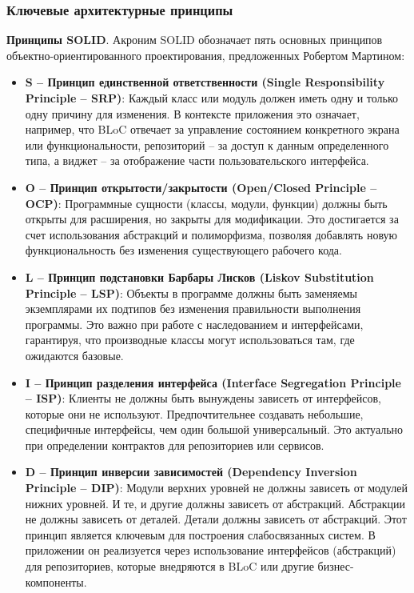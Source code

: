 \subsubsection*{Ключевые архитектурные принципы}
\textbf{Принципы SOLID}.
Акроним SOLID обозначает пять основных принципов объектно-ориентированного проектирования, предложенных Робертом Мартином:
\begin{itemize}
    \item \textbf{S – Принцип единственной ответственности (Single Responsibility Principle – SRP)}: Каждый класс или модуль должен иметь одну и только одну причину для изменения. В контексте приложения это означает, например, что BLoC отвечает за управление состоянием конкретного экрана или функциональности, репозиторий – за доступ к данным определенного типа, а виджет – за отображение части пользовательского интерфейса.
    \item \textbf{O – Принцип открытости/закрытости (Open/Closed Principle – OCP)}: Программные сущности (классы, модули, функции) должны быть открыты для расширения, но закрыты для модификации. Это достигается за счет использования абстракций и полиморфизма, позволяя добавлять новую функциональность без изменения существующего рабочего кода.
    \item \textbf{L – Принцип подстановки Барбары Лисков (Liskov Substitution Principle – LSP)}: Объекты в программе должны быть заменяемы экземплярами их подтипов без изменения правильности выполнения программы. Это важно при работе с наследованием и интерфейсами, гарантируя, что производные классы могут использоваться там, где ожидаются базовые.
    \item \textbf{I – Принцип разделения интерфейса (Interface Segregation Principle – ISP)}: Клиенты не должны быть вынуждены зависеть от интерфейсов, которые они не используют. Предпочтительнее создавать небольшие, специфичные интерфейсы, чем один большой универсальный. Это актуально при определении контрактов для репозиториев или сервисов.
    \item \textbf{D – Принцип инверсии зависимостей (Dependency Inversion Principle – DIP)}: Модули верхних уровней не должны зависеть от модулей нижних уровней. И те, и другие должны зависеть от абстракций. Абстракции не должны зависеть от деталей. Детали должны зависеть от абстракций. Этот принцип является ключевым для построения слабосвязанных систем. В приложении он реализуется через использование интерфейсов (абстракций) для репозиториев, которые внедряются в BLoC или другие бизнес-компоненты.
\end{itemize}

